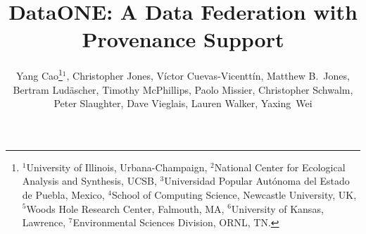 \documentclass[a4paper]{llncs}
\begin{document}
\mainmatter  %

\title{DataONE: A Data Federation with Provenance Support}


\author{{Yang Cao\thanks{
$^1$University of Illinois, Urbana-Champaign, 
$^2$National Center for Ecological Analysis and Synthesis, UCSB,
$^3$Universidad Popular Aut\'onoma del Estado de Puebla, Mexico,
$^4$School of Computing Science, Newcastle  University, UK,
$^5$Woods Hole Research Center, Falmouth, MA,
$^6$University of Kansas, Lawrence,
$^7$Environmental Sciences Division, ORNL, TN.}$^1$,
Christopher Jones,  V\'ictor Cuevas-Vicentt\'in, Matthew B.\ Jones,  Bertram Lud\"ascher,  Timothy McPhillips,  Paolo Missier,   Christopher Schwalm,  Peter Slaughter,  Dave Vieglais,  Lauren Walker, Yaxing~Wei }}

\institute{\relax}





%
%

\maketitle
\end{document}

